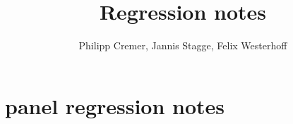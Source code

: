 \documentclass{article}
\title{Regression notes}
\author{Philipp Cremer, Jannis Stagge, Felix Westerhoff}
\begin{document}
\maketitle

\section{panel regression notes}
\noindent \underline{} \\
\end{document}
